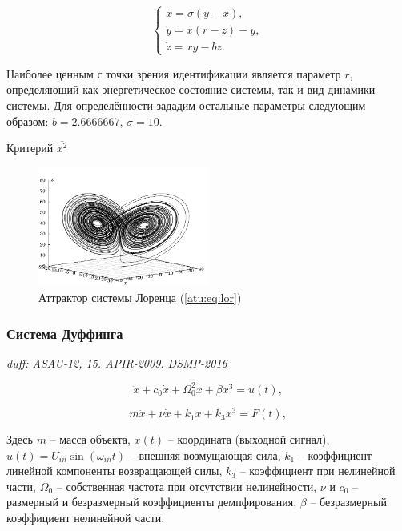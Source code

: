 \documentclass[a4paper,12pt]{article}
\newcommand{\LinkRef}[1]{ \textit{\color{red}#1} }
\begin{document}
\begin{equation}
\begin{cases}
  \dot{x} = \sigma (y-x ) , \\
  \dot{y} = x (r-z) - y , \\
  \dot{z} = x y - b z .
\end{cases}
\label{atu:eq:lor}
\end{equation}

Наиболее ценным с точки зрения идентификации является параметр
$r$, определяющий как энергетическое состояние системы,
так и вид динамики системы.
Для определённости зададим остальные параметры следующим образом:
$b = 2.6666667$, $\sigma = 10$.

Критерий
$\overline{x^2}$


%


\begin{figure}[htb!]
\centerline{\includegraphics[width=0.5\textwidth]{p/cha/lor_phase3.pdf} }
\caption{Аттрактор системы Лоренца (\ref{atu:eq:lor})}
\label{atu:f:lor_phase}
\end{figure}


\FloatBarrier
\subsubsection{Система Дуффинга} %

\LinkRef{
 duff: ASAU-12, 15. APIR-2009. DSMP-2016
}

\begin{equation}
 \ddot{x} + c_0 \dot{x} + \Omega_0^2 x + \beta x^3 = u(t) ,
\label{atu:eq:duff}
\end{equation}

\begin{equation}
 m \ddot{x} + \nu \dot{x} + k_1 x + k_3 x^3 = F(t) ,
\label{atu:eq:duff_phys}
\end{equation}

Здесь \(m\) -- масса объекта,
\(x(t)\) -- координата (выходной сигнал),
\(u(t) = U_{in} \sin( \omega_{in} t ) \) -- внешняя возмущающая сила,
\( k_1 \) -- коэффициент линейной компоненты возвращающей силы,
\( k_3 \) -- коэффициент при нелинейной части,
\( \Omega_0 \) -- собственная частота при отсутствии нелинейности,
\( \nu \) и \( c_0\) -- размерный и безразмерный коэффициенты демпфирования,
\( \beta \) -- безразмерный коэффициент нелинейной части.
\end{document}
